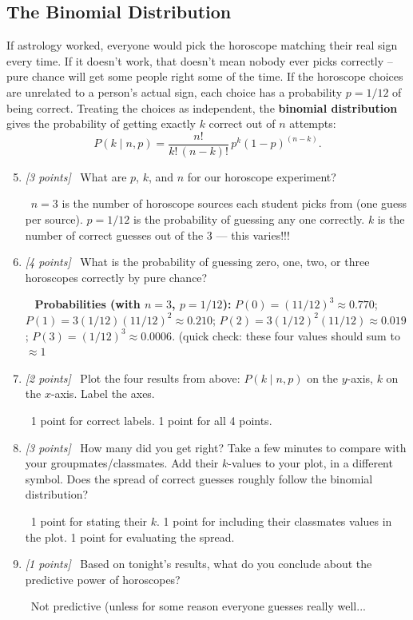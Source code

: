 \documentclass[11pt]{article}
\newcommand{\pts}[1]{\textit{[#1 points]}\ }
\newcommand{\ans}[1]{%
  \par\smallskip\noindent{\color{blue!55!black}\textbf{Answer:}}\ #1\par\smallskip}
\begin{document}
\subsection{The Binomial Distribution}
If astrology worked, everyone would pick the horoscope matching their real
sign every time. If it doesn't work, that doesn't mean nobody ever picks
correctly -- pure chance will get some people right some of the time. If
the horoscope choices are unrelated to a person's actual sign, each choice
has a probability $p = 1/12$ of being correct. Treating the choices as
independent, the \textbf{binomial distribution} gives the probability of
getting exactly $k$ correct out of $n$ attempts:
\begin{equation}
    P(k \mid n, p) = \frac{n!}{k!\,(n-k)!}\, p^k (1-p)^{(n-k)}.
\end{equation}
\begin{enumerate}
    \setcounter{enumi}{4}
    \item \pts{3} What are $p$, $k$, and $n$ for our horoscope experiment?

    \ans{\textbf{$n=3$} is the number of horoscope sources each
    student picks from (one guess per source). \textbf{$p=1/12$ }is the probability
    of guessing any one correctly.
    $k$ is the number of correct guesses out of the 3 --- this varies!!!  }

    \item
    \pts{4} What is the probability of guessing zero, one, two, or three
        horoscopes correctly by pure chance?

    \ans{ \textbf{Probabilities
    (with $n=3$, $p=1/12$):} $P(0)=(11/12)^3\approx0.770$;
    $P(1)=3(1/12)(11/12)^2\approx0.210$; $P(2)=3(1/12)^2(11/12)\approx0.019$;
    $P(3)=(1/12)^3\approx0.0006$. (quick check: these four values should sum to
    $\approx1$}

   

        \item \pts{2} Plot the four results from above: $P(k \mid n, p)$ on the $y$-axis, $k$ on the $x$-axis. Label the axes.

        \ans{1 point for correct labels. 1 point for all 4 points.}

        \item \pts{3} How many did you get right? Take a few minutes to compare with your groupmates/classmates. Add their $k$-values to your plot, in a different symbol. Does the spread of correct guesses roughly follow
        the binomial distribution? 

        \ans{1 point for stating their $k$. 1 point for including their classmates values in the plot. 1 point for evaluating the spread.}

        \item \pts{1} Based on tonight's results, what do you conclude about the
        predictive power of horoscopes? 

        \ans{Not predictive (unless for some reason everyone guesses really well...}

\end{enumerate}
\end{document}
